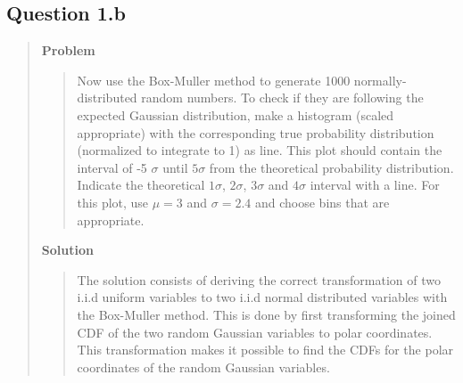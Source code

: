 
\subsection*{\textbf{Question 1.b}}
\begin{quote}

\textbf{Problem}
\begin{quote}Now use the Box-Muller method to generate 1000 normally-distributed random numbers. To check if they are following the expected Gaussian distribution, make a histogram (scaled appropriate) with the corresponding true probability distribution (normalized to integrate to 1) as line. This plot should contain the interval of -5 $\sigma$ until $5\sigma$ from the theoretical probability distribution. Indicate the theoretical $1\sigma$, $2\sigma$, $3\sigma$ and $4\sigma$ interval with a line. For this plot, use $\mu =3$ and $\sigma = 2.4$ and choose bins that are appropriate.
\end{quote}

\textbf{Solution} 



\begin{quote}
The solution consists of deriving the correct transformation of two i.i.d uniform variables to two i.i.d normal distributed variables with the Box-Muller method. This is done by first transforming the joined CDF of the two random Gaussian variables to polar coordinates. This transformation makes it possible to find the CDFs for the polar coordinates of the random Gaussian variables. 





\end{quote}
\end{quote}
